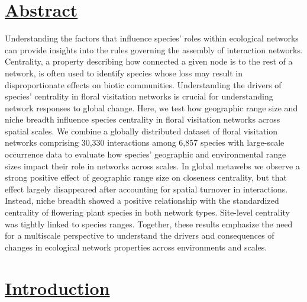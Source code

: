 
\section*{\textbf{\underline{Abstract}}}
Understanding the factors that influence species' roles within ecological networks can provide insights into the rules governing the assembly of interaction networks. Centrality, a property describing how connected a given node is to the rest of a network, is often used to identify species whose loss may result in disproportionate effects on biotic communities. Understanding the drivers of species' centrality in floral visitation networks is crucial for understanding network responses to global change. Here, we test how geographic range size and niche breadth influence species centrality in floral visitation networks across spatial scales. We combine a globally distributed dataset of floral visitation networks comprising 30,330 interactions among 6,857 species with large-scale occurrence data to evaluate how species’ geographic and environmental range sizes impact their role in networks across scales. In global metawebs we observe a strong positive effect of geographic range size on closeness centrality, but that effect largely disappeared after accounting for spatial turnover in interactions. Instead, niche breadth showed a positive relationship with the standardized centrality of flowering plant species in both network types. Site-level centrality was tightly linked to species ranges. Together, these results emphasize the need for a multiscale perspective to understand the drivers and consequences of changes in ecological network properties across environments and scales.


\section*{\textbf{\underline{Introduction}}}

